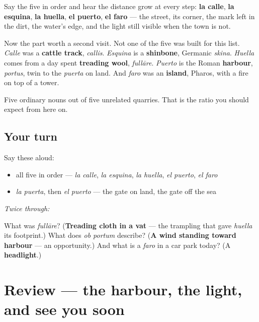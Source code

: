 \begin{grammarlens}[title={What you've built}]
Say the five in order and hear the distance grow at every step: \textbf{la calle}, \textbf{la esquina}, \textbf{la huella}, \textbf{el puerto}, \textbf{el faro} — the street, its corner, the mark left in the dirt, the water's edge, and the light still visible when the town is not.

Now the part worth a second visit. Not one of the five was built for this list. \emph{Calle} was a \textbf{cattle track}, \emph{callis}. \emph{Esquina} is a \textbf{shinbone}, Germanic \emph{skina}. \emph{Huella} comes from a day spent \textbf{treading wool}, \emph{fullāre}. \emph{Puerto} is the Roman \textbf{harbour}, \emph{portus}, twin to the \emph{puerta} on land. And \emph{faro} was an \textbf{island}, Pharos, with a fire on top of a tower.

Five ordinary nouns out of five unrelated quarries. That is the ratio you should expect from here on.
\end{grammarlens}

\subsection*{Your turn}
Say these aloud:

\begin{itemize}
\raggedright
  \item all five in order — \emph{la calle}, \emph{la esquina}, \emph{la huella}, \emph{el puerto}, \emph{el faro}
  \item \emph{la puerta}, then \emph{el puerto} — the gate on land, the gate off the sea
\end{itemize}

\emph{Twice through:}

\begin{tcolorbox}[breakable,colback=teal!4,colframe=teal!35!black,title={Before you move on}]
What was \emph{fullāre}? (\textbf{Treading cloth in a vat} — the trampling that gave \emph{huella} its footprint.) What does \emph{ob portum} describe? (\textbf{A wind standing toward harbour} — an opportunity.) And what is a \emph{faro} in a car park today? (A \textbf{headlight}.)
\end{tcolorbox}
\section[(review)]{Review — the harbour, the light, and see you soon}

\label{lesson:ES-C319-despedida}



